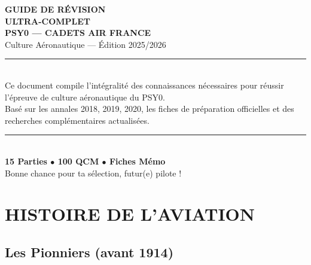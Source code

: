 \documentclass[11pt,a4paper]{article}
\begin{document}
\begin{titlepage}
\begin{center}
\vspace*{2cm}
{\Huge\bfseries\color{afblue} GUIDE DE RÉVISION\\[0.3cm] ULTRA-COMPLET}\\[1cm]
{\LARGE\color{afred}\bfseries PSY0 --- CADETS AIR FRANCE}\\[0.8cm]
{\Large Culture Aéronautique --- Édition 2025/2026}\\[2cm]
\rule{\textwidth}{2pt}\\[0.5cm]
{\large Ce document compile l'intégralité des connaissances nécessaires pour réussir l'épreuve de culture aéronautique du PSY0.\\[0.3cm]
Basé sur les annales 2018, 2019, 2020, les fiches de préparation officielles et des recherches complémentaires actualisées.}\\[0.5cm]
\rule{\textwidth}{2pt}\\[2cm]
{\Large\textbf{15 Parties $\bullet$ 100 QCM $\bullet$ Fiches Mémo}}\\[3cm]
{\large\color{gray} Bonne chance pour ta sélection, futur(e) pilote !}
\end{center}
\end{titlepage}

\tableofcontents
\newpage

\section{HISTOIRE DE L'AVIATION}

\subsection{Les Pionniers (avant 1914)}
\end{document}
